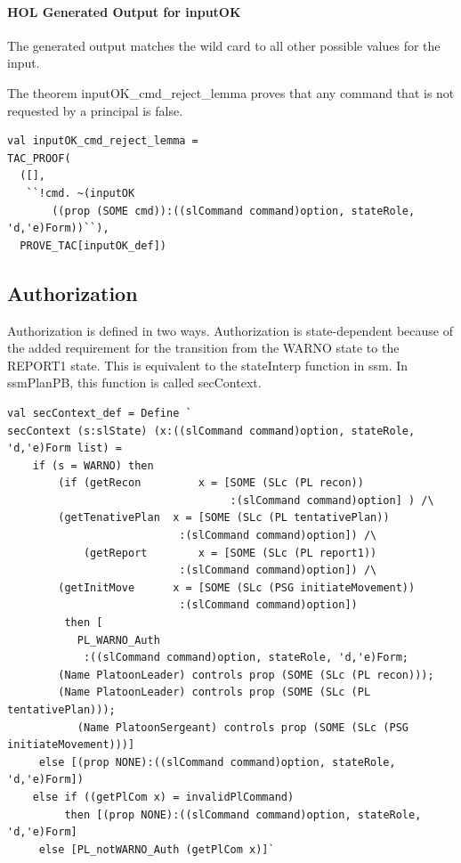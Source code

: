 \documentclass[../../main/main.tex]{subfiles}
\begin{document}
	 
\paragraph*{HOL Generated Output for inputOK}

The  generated output matches the wild card to all other possible values for the input.

\HOLssmPlanPBTheoremsinputOKXXdef

The theorem inputOK_cmd_reject_lemma proves that any command that is not requested by a principal is false.

\begin{lstlisting}
val inputOK_cmd_reject_lemma =
TAC_PROOF(
  ([],
   ``!cmd. ~(inputOK
   	   ((prop (SOME cmd)):((slCommand command)option, stateRole, 'd,'e)Form))``),
  PROVE_TAC[inputOK_def])
\end{lstlisting}


\subsection{Authorization}
Authorization is defined in two ways.  Authorization is state-dependent because of the added requirement for the transition from the WARNO state to the REPORT1 state.  This is equivalent to the stateInterp function in ssm.  In ssmPlanPB, this function is called secContext.

\begin{lstlisting}
val secContext_def = Define `
secContext (s:slState) (x:((slCommand command)option, stateRole, 'd,'e)Form list) =
    if (s = WARNO) then
        (if (getRecon         x = [SOME (SLc (PL recon))
                                   :(slCommand command)option] ) /\
	    (getTenativePlan  x = [SOME (SLc (PL tentativePlan))
	    		      	   :(slCommand command)option]) /\
            (getReport        x = [SOME (SLc (PL report1))
	    		      	   :(slCommand command)option]) /\
	    (getInitMove      x = [SOME (SLc (PSG initiateMovement))
	    		      	   :(slCommand command)option])
         then [
	       PL_WARNO_Auth
	        :((slCommand command)option, stateRole, 'd,'e)Form;
		(Name PlatoonLeader) controls prop (SOME (SLc (PL recon)));
		(Name PlatoonLeader) controls prop (SOME (SLc (PL tentativePlan)));
	       (Name PlatoonSergeant) controls prop (SOME (SLc (PSG initiateMovement)))]
	 else [(prop NONE):((slCommand command)option, stateRole, 'd,'e)Form])
    else if ((getPlCom x) = invalidPlCommand)
    	 then [(prop NONE):((slCommand command)option, stateRole, 'd,'e)Form]
	 else [PL_notWARNO_Auth (getPlCom x)]`
\end{lstlisting}
\end{document}
